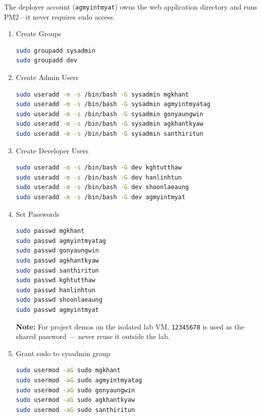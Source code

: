 \documentclass[12pt,a4paper]{report}
\begin{document}
\begin{markdownnote}
The deployer account (\texttt{agmyintmyat}) owns the web application directory and runs PM2---it never requires sudo access.
\end{markdownnote}

\begin{enumerate}
\item Create Groups
\begin{lstlisting}[language=bash]
sudo groupadd sysadmin
sudo groupadd dev
\end{lstlisting}

\item Create Admin Users
\begin{lstlisting}[language=bash]
sudo useradd -m -s /bin/bash -G sysadmin mgkhant
sudo useradd -m -s /bin/bash -G sysadmin agmyintmyatag
sudo useradd -m -s /bin/bash -G sysadmin gonyaungwin
sudo useradd -m -s /bin/bash -G sysadmin agkhantkyaw
sudo useradd -m -s /bin/bash -G sysadmin santhiritun
\end{lstlisting}

\item Create Developer Users
\begin{lstlisting}[language=bash]
sudo useradd -m -s /bin/bash -G dev kghtutthaw
sudo useradd -m -s /bin/bash -G dev hanlinhtun
sudo useradd -m -s /bin/bash -G dev shoonlaeaung
sudo useradd -m -s /bin/bash -G dev agmyintmyat
\end{lstlisting}

\item Set Passwords
\begin{lstlisting}[language=bash]
sudo passwd mgkhant
sudo passwd agmyintmyatag
sudo passwd gonyaungwin
sudo passwd agkhantkyaw
sudo passwd santhiritun
sudo passwd kghtutthaw
sudo passwd hanlinhtun
sudo passwd shoonlaeaung
sudo passwd agmyintmyat
\end{lstlisting}

\begin{markdownnote}
\textbf{Note:} For project demos on the isolated lab VM, \texttt{12345678} is used as the shared password — never reuse it outside the lab.
\end{markdownnote}

\item Grant sudo to sysadmin group
\begin{lstlisting}[language=bash]
sudo usermod -aG sudo mgkhant
sudo usermod -aG sudo agmyintmyatag
sudo usermod -aG sudo gonyaungwin
sudo usermod -aG sudo agkhantkyaw
sudo usermod -aG sudo santhiritun
\end{lstlisting}


\end{enumerate}
\end{document}
